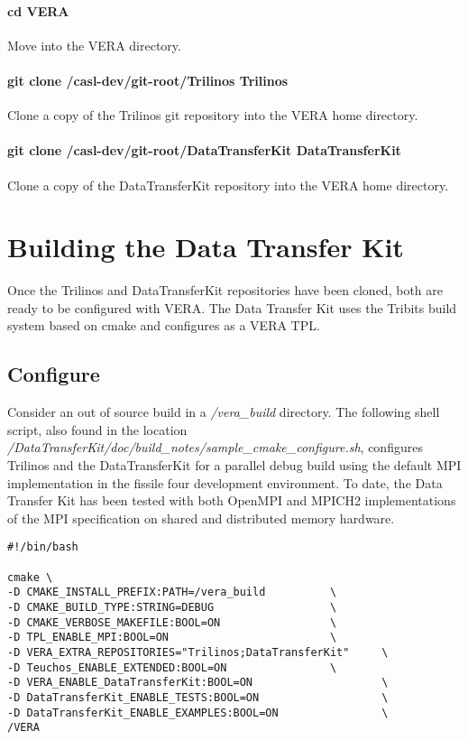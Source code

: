 \documentclass[letterpaper]{article}
\begin{document}
\paragraph{cd VERA}
Move into the VERA directory.

\paragraph{git clone /casl-dev/git-root/Trilinos Trilinos}
Clone a copy of the Trilinos git repository into the VERA home
directory. 

\paragraph{git clone /casl-dev/git-root/DataTransferKit DataTransferKit} 
Clone a copy of the DataTransferKit repository into the VERA home
directory.

\section{Building the Data Transfer Kit}
Once the Trilinos and DataTransferKit repositories have been cloned, both are
ready to be configured with VERA. The Data Transfer Kit uses the
Tribits build system based on cmake and configures as a VERA TPL.

\subsection{Configure}
Consider an out of source build in a {\sl /vera\_build} directory. The
following shell script, also found in the location {\sl
  /DataTransferKit/doc/build\_notes/sample\_cmake\_configure.sh},
configures Trilinos and the DataTransferKit for a parallel debug build
using the default MPI implementation in the fissile four development
environment. To date, the Data Transfer Kit has been tested with both
OpenMPI and MPICH2 implementations of the MPI specification on shared
and distributed memory hardware.

\begin{verbatim}
#!/bin/bash

cmake \
-D CMAKE_INSTALL_PREFIX:PATH=/vera_build          \
-D CMAKE_BUILD_TYPE:STRING=DEBUG                  \
-D CMAKE_VERBOSE_MAKEFILE:BOOL=ON                 \
-D TPL_ENABLE_MPI:BOOL=ON                         \
-D VERA_EXTRA_REPOSITORIES="Trilinos;DataTransferKit"     \
-D Teuchos_ENABLE_EXTENDED:BOOL=ON                \
-D VERA_ENABLE_DataTransferKit:BOOL=ON                    \
-D DataTransferKit_ENABLE_TESTS:BOOL=ON                   \
-D DataTransferKit_ENABLE_EXAMPLES:BOOL=ON                \
/VERA
\end{verbatim}
\end{document}
